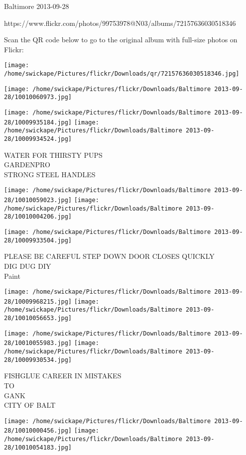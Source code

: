 \documentclass[10pt,letterpaper]{article}
\begin{document}
Baltimore 2013-09-28

https://www.flickr.com/photos/99753978@N03/albums/72157636030518346

Scan the QR code below to go to the original album with full-size photos on Flickr:

\texttt{[image: /home/swickape/Pictures/flickr/Downloads/qr/72157636030518346.jpg]}
\pagebreak

\texttt{[image: /home/swickape/Pictures/flickr/Downloads/Baltimore 2013-09-28/10010060973.jpg]}

\vspace{0.25in}
\texttt{[image: /home/swickape/Pictures/flickr/Downloads/Baltimore 2013-09-28/10009935184.jpg]}
\texttt{[image: /home/swickape/Pictures/flickr/Downloads/Baltimore 2013-09-28/10009934524.jpg]}

WATER FOR THIRSTY PUPS\\
GARDENPRO\\
STRONG STEEL HANDLES
\pagebreak

\texttt{[image: /home/swickape/Pictures/flickr/Downloads/Baltimore 2013-09-28/10010059023.jpg]}
\texttt{[image: /home/swickape/Pictures/flickr/Downloads/Baltimore 2013-09-28/10010004206.jpg]}

\vspace{0.25in}
\texttt{[image: /home/swickape/Pictures/flickr/Downloads/Baltimore 2013-09-28/10009933504.jpg]}

PLEASE BE CAREFUL STEP DOWN DOOR CLOSES QUICKLY\\
DIG DUG DIY\\
Paint
\pagebreak

\texttt{[image: /home/swickape/Pictures/flickr/Downloads/Baltimore 2013-09-28/10009968215.jpg]}
\texttt{[image: /home/swickape/Pictures/flickr/Downloads/Baltimore 2013-09-28/10010056653.jpg]}

\texttt{[image: /home/swickape/Pictures/flickr/Downloads/Baltimore 2013-09-28/10010055983.jpg]}
\texttt{[image: /home/swickape/Pictures/flickr/Downloads/Baltimore 2013-09-28/10009930534.jpg]}

FISHGLUE CAREER IN MISTAKES\\
TO\\
GANK\\
CITY OF BALT
\pagebreak

\texttt{[image: /home/swickape/Pictures/flickr/Downloads/Baltimore 2013-09-28/10010000456.jpg]}
\texttt{[image: /home/swickape/Pictures/flickr/Downloads/Baltimore 2013-09-28/10010054183.jpg]}
\end{document}
